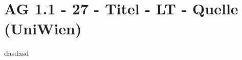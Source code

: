 \section{AG 1.1 - 27 - Titel  - LT - Quelle (UniWien)}

\begin{beispiel}[AG 1.1]{1}
dasdasd
\end{beispiel}